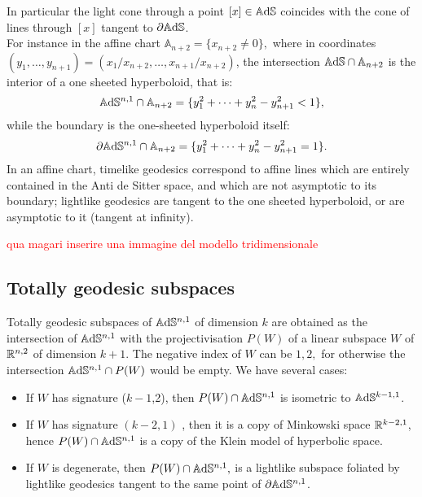 In particular the light cone through a point $[x]\in \mathbb{A}\mathrm{d}\mathbb{S}$ coincides with the cone of lines through $[x]$ tangent to $\partial \mathbb{A}\mathrm{d}\mathbb{S}$.\\ For instance in the affine chart $\mathbb{A}_{n+2}=\{x_{n+2}\neq 0\},$ where in coordinates $(y_1, \dots, y_{n+1})=(x_1/x_{n+2},\dots, x_{n+1}/x_{n+2})$, the intersection $\mathbb{A}\mathrm{d}\mathbb{S}\cap\mathbb{A}_{n+2}$ is the interior of a one sheeted hyperboloid, that is: 
\[
    \mathbb{A}\mathrm{d}\mathbb{S}^{n,1}\cap\mathbb{A}_{n+2}=\{y_1^2+\dots+y_n^2-y_{n+1}^2<1\},
\]
 while the boundary is the one-sheeted hyperboloid itself: 
 \[
    \partial\mathbb{A}\mathrm{d}\mathbb{S}^{n,1}\cap\mathbb{A}_{n+2}=\{y_1^2+\dots+y_n^2-y_{n+1}^2=1\}.
\]
In an affine chart, timelike geodesics correspond to affine lines which are entirely contained in the Anti de Sitter space, and which are not asymptotic to its boundary; lightlike geodesics are tangent to the one sheeted hyperboloid, or are asymptotic to it (tangent at infinity).

\textcolor{red}{qua magari inserire una immagine del modello tridimensionale}


\subsection{Totally geodesic subspaces} Totally geodesic subspaces of $\mathbb{A}\mathrm{d}\mathbb{S}^{n,1}$ of dimension $k$ are obtained as the intersection of $\mathbb{A}\mathrm{d}\mathbb{S}^{n,1}$ with the projectivisation $P(W)$ of a linear subspace $W$ of $\mathbb{R}^{n,2}$ of dimension $k+1.$ The negative index of $W$ can be $1, 2,$ for otherwise the intersection $\mathbb{A}\mathrm{d}\mathbb{S}^{n,1}\cap P(W)$ would be empty. We have several cases: 
\begin{itemize}
    \item If $W$ has signature ($k-1$,2), then $P(W)\cap \mathbb{A}\mathrm{d}\mathbb{S}^{n,1}$ is isometric to $\mathbb{A}\mathrm{d}\mathbb{S}^{k-1,1}$. 
    \item If $W$ has signature $(k-2, 1)$ , then it is a copy of Minkowski space $\mathbb{R}^{k-2,1}$, hence $P(W)\cap \mathbb{A}\mathrm{d}\mathbb{S}^{n,1}$ is a copy of the Klein model of hyperbolic space. 
    \item If $W$ is degenerate, then $P(W)\cap \mathbb{A}\mathrm{d}\mathbb{S}^{n,1},$ is a lightlike subspace foliated by lightlike geodesics tangent to the same point of $\partial\mathbb{A}\mathrm{d}\mathbb{S}^{n,1}$. 
\end{itemize}  

